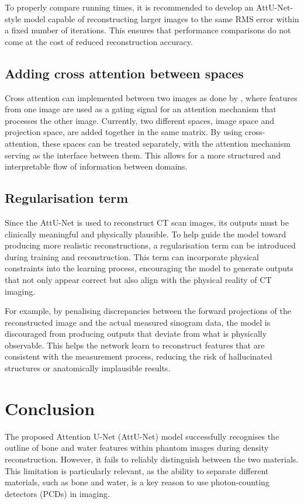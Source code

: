 \documentclass{article}
\begin{document}
To properly compare running times, it is recommended to develop an AttU-Net-style model capable of reconstructing larger images to the same RMS error within a fixed number of iterations. This ensures that performance comparisons do not come at the cost of reduced reconstruction accuracy.

\subsection{Adding cross attention between spaces}

Cross attention can implemented between two images as done by \citep{alaluf2023cross}, where features from one image are used as a gating signal for an attention mechanism that processes the other image. Currently, two different spaces, image space and projection space, are added together in the same matrix. By using cross-attention, these spaces can be treated separately, with the attention mechanism serving as the interface between them. This allows for a more structured and interpretable flow of information between domains.

\subsection{Regularisation term}

Since the AttU-Net is used to reconstruct CT scan images, its outputs must be clinically meaningful and physically plausible. To help guide the model toward producing more realistic reconstructions, a regularisation term can be introduced during training and reconstruction. This term can incorporate physical constraints into the learning process, encouraging the model to generate outputs that not only appear correct but also align with the physical reality of CT imaging.

For example, by penalising discrepancies between the forward projections of the reconstructed image and the actual measured sinogram data, the model is discouraged from producing outputs that deviate from what is physically observable. This helps the network learn to reconstruct features that are consistent with the measurement process, reducing the risk of hallucinated structures or anatomically implausible results.

\section{Conclusion}

The proposed Attention U-Net (AttU-Net) model successfully recognises the outline of bone and water features within phantom images during density reconstruction. However, it fails to reliably distinguish between the two materials. This limitation is particularly relevant, as the ability to separate different materials, such as bone and water, is a key reason to use photon-counting detectors (PCDs) in imaging.
\end{document}
